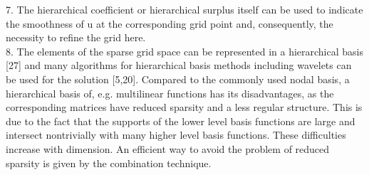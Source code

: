 7. The hierarchical coefficient or hierarchical surplus itself can be used to indicate the smoothness of u at the corresponding grid point and, consequently, the necessity to refine the grid here.\cite{Bungartz1998}\\

8. The elements of the sparse grid space can be represented in a hierarchical basis [27] and many algorithms for hierarchical basis methods including wavelets can be used for the solution [5,20]. Compared to the commonly used nodal basis, a hierarchical basis of, e.g. multilinear functions has its disadvantages, as the corresponding matrices have reduced sparsity and a less regular structure. This is due to the fact that the supports of the lower level basis functions are large and intersect nontrivially with many higher level basis functions. These difficulties increase with dimension.
An efficient way to avoid the problem of reduced sparsity is given by the combination technique. \cite{Hegland2007}\\



